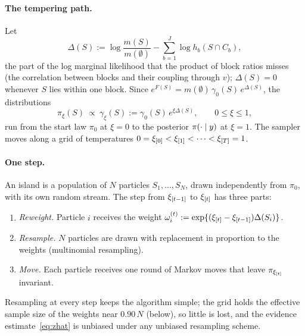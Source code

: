 \paragraph{The tempering path.} Let
\[
  \Delta(S):=\log\frac{m(S)}{m(\emptyset)}-\sum_{b=1}^{J}\log h_b(S\cap C_b),
\]
the part of the log marginal likelihood that the product of block ratios misses (the correlation between blocks and
their coupling through $v$); $\Delta(S)=0$ whenever $S$ lies within one block. Since $e^{F(S)}=m(\emptyset)\,\gamma_0(S)\,e^{\Delta(S)}$, the distributions
\begin{equation}\label{eq:path}
  \pi_\xi(S)\ \propto\ \gamma_\xi(S):=\gamma_0(S)\,e^{\xi\Delta(S)},\qquad 0\le\xi\le1,
\end{equation}
run from the start law $\pi_0$ at $\xi=0$ to the posterior $\pi(\cdot\mid y)$ at $\xi=1$. The sampler moves along a grid
of temperatures $0=\xi_{[0]}<\xi_{[1]}<\dots<\xi_{[T]}=1$.

\paragraph{One step.} An island is a population of $N$ particles $S_1,\dots,S_N$, drawn independently from $\pi_0$,
with its own random stream. The step from $\xi_{[t-1]}$ to $\xi_{[t]}$ has three parts:
\begin{enumerate}
  \item \emph{Reweight.} Particle $i$ receives the weight $\omega^{(t)}_i:=\exp\{(\xi_{[t]}-\xi_{[t-1]})\Delta(S_i)\}$.
  \item \emph{Resample.} $N$ particles are drawn with replacement in proportion to the weights (multinomial
    resampling).
  \item \emph{Move.} Each particle receives one round of Markov moves that leave $\pi_{\xi_{[t]}}$ invariant.
\end{enumerate}
Resampling at every step keeps the algorithm simple; the grid holds the effective sample size of the weights near
$0.90\,N$ (below), so little is lost, and the evidence estimate~\eqref{eq:zhat} is unbiased under any unbiased
resampling scheme.

